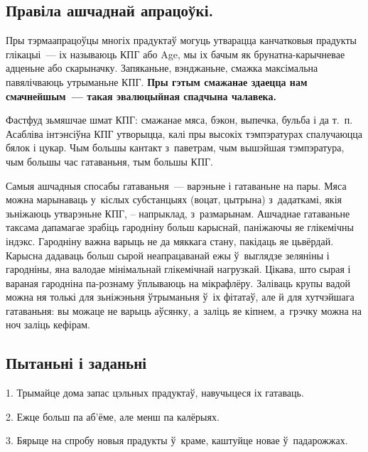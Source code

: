 
\subsection*{Правіла ашчаднай апрацоўкі.}
Пры тэрмаапрацоўцы многіх прадуктаў могуць утварацца канчатковыя прадукты глікацыі~--- іх называюць КПГ або Age, мы іх бачым як брунатна-карычневае адценьне або скарыначку. Запяканьне, вэнджаньне, смажка максімальна павялічваюць утрыманьне КПГ. \textbf{Пры гэтым смажанае здаецца нам смачнейшым~--- такая эвалюцыйная спадчына чалавека.}

Фастфуд зьмяшчае шмат КПГ: смажанае мяса, бэкон, выпечка, бульба і да т.~п. Асабліва інтэнсіўна КПГ утворыцца, калі пры высокіх тэмпэратурах спалучаюцца бялок і цукар. Чым большы кантакт з~паветрам, чым вышэйшая тэмпэратура, чым большы час гатаваньня, тым большы КПГ. 


Самыя ашчадныя спосабы гатаваньня~--- варэньне і гатаваньне на пары. Мяса можна марынаваць у~кіслых субстанцыях (воцат, цытрына) з~дадаткамі, якія зьніжаюць утварэньне КПГ, -- напрыклад, з~размарынам. Ашчаднае гатаваньне таксама дапамагае зрабіць гародніну больш карыснай, паніжаючы яе глікемічны індэкс. Гародніну важна варыць не да мяккага стану, пакідаць яе цьвёрдай. Карысна дадаваць больш сырой неапрацаванай ежы ў~выглядзе зеляніны і гародніны, яна валодае мінімальнай глікемічнай нагрузкай. Цікава, што сырая і вараная гародніна па-рознаму ўплываюць на мікрафлёру. Заліваць крупы вадой можна ня толькі для зьніжэньня ўтрыманьня ў~іх фітатаў, але й для хутчэйшага гатаваньня: вы можаце не варыць аўсянку, а~заліць яе кіпнем, а~грэчку можна на ноч заліць кефірам.

\subsection*{Пытаньні і заданьні}

1. Трымайце дома запас цэльных прадуктаў, навучыцеся іх гатаваць.

2. Ежце больш па аб'ёме, але менш па калёрыях.

3. Бярыце на спробу новыя прадукты ў~краме, каштуйце новае ў~падарожжах.


